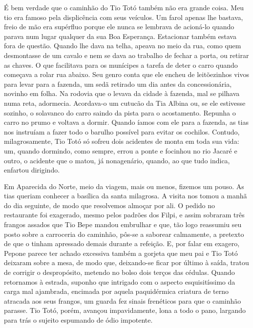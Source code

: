 É bem verdade que o caminhão do Tio Totó também não era grande coisa.
Meu tio era famoso pela displicência com seus veículos.
Um farol apenas lhe bastava, freio de mão era supérfluo porque ele nunca se lembrava de acioná-lo quando parava num lugar qualquer da sua Boa Esperança.
Estacionar também estava fora de questão.
Quando lhe dava na telha, apeava no meio da rua, como quem desmontasse de um cavalo e nem se dava ao trabalho de fechar a porta, ou retirar as chaves.
O que facilitava para os munícipes a tarefa de deter o carro quando começava a rolar rua abaixo.
Seu genro conta que ele encheu de leitõezinhos vivos para levar para a fazenda, um sedã retirado um dia antes da concessionária, novinho em folha.
Na rodovia que o levava da cidade à fazenda, mal se pilhava numa reta, adormecia.
Acordava-o um cutucão da Tia Albina ou, se ele estivesse sozinho, o solavanco do carro saindo da pista para o acostamento.
Repunha o carro no prumo e voltava a dormir.
Quando íamos com ele para a fazenda, as tias nos instruíam a fazer todo o barulho possível para evitar os cochilos.
Contudo, milagrosamente, Tio Totó só sofreu dois acidentes de monta em toda sua vida: um, quando dormindo, como sempre, errou a ponte e focinhou no rio Jacaré e outro, o acidente que o matou, já nonagenário, quando, ao que tudo indica, enfartou dirigindo.


Em Aparecida do Norte, meio da viagem, mais ou menos, fizemos um pouso.
As tias queriam conhecer a basílica da santa milagrosa.
A visita nos tomou a manhã do dia seguinte, de modo que resolvemos almoçar por ali.
O pedido no restaurante foi exagerado, mesmo pelos padrões dos Filpi, e assim sobraram três frangos assados que Tio Bepe mandou embrulhar e que, tão logo reassumiu seu posto sobre a carroceria do caminhão, pôs-se a saborear calmamente, a pretexto de que o tinham apressado demais durante a refeição.
E, por falar em exagero, Pepone parece ter achado excessiva também a gorjeta que meu pai e Tio Totó deixaram sobre a mesa, de modo que, deixando-se ficar por último à saída, tratou de corrigir o despropósito, metendo no bolso dois terços das cédulas.
Quando retornamos à estrada, suponho que intrigado com o aspecto esquisitíssimo da carga mal ajambrada, encimada por aquela paquidérmica criatura de terno atracada aos seus frangos, um guarda fez sinais frenéticos para que o caminhão parasse.
Tio Totó, porém, avançou impavidamente, lona a todo o pano, largando para trás o sujeito espumando de ódio impotente.

